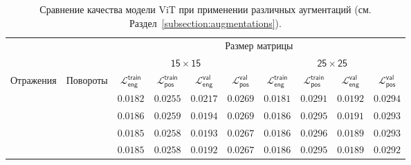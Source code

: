 \documentclass[a4paper,12pt]{extarticle}
\newcommand{\cmark}{\ding{51}}
\newcommand{\xmark}{\ding{55}}
\begin{document}
\begin{table}[t]
	\footnotesize
	\centering
	\begin{tabular}{cc|cccc|cccc}
		\toprule
		{} & {} & \multicolumn{8}{c}{\textsf{Размер матрицы}} \\
		\cmidrule(lr){3-10}
        {} & {} & \multicolumn{4}{c}{$\mathsf{15 \times 15}$} \vline & \multicolumn{4}{c}{$\mathsf{25 \times 25}$} \\
		\midrule
        \textsf{Отражения} & \textsf{Повороты} & $\mathcal{L}_{\mathsf{eng}}^{\mathsf{train}}$ & $\mathcal{L}_{\mathsf{pos}}^{\mathsf{train}}$ & $\mathcal{L}_{\mathsf{eng}}^{\mathsf{val}}$ & $\mathcal{L}_{\mathsf{pos}}^{\mathsf{val}}$ & $\mathcal{L}_{\mathsf{eng}}^{\mathsf{train}}$ & $\mathcal{L}_{\mathsf{pos}}^{\mathsf{train}}$ & $\mathcal{L}_{\mathsf{eng}}^{\mathsf{val}}$ & $\mathcal{L}_{\mathsf{pos}}^{\mathsf{val}}$ \\
        \midrule
        \xmark & \xmark & $\mathsf{0.0182}$ & $\mathsf{0.0255}$ & $\mathsf{0.0217}$ & $\mathsf{0.0269}$ & $\mathsf{0.0181}$ & $\mathsf{0.0291}$ & $\mathsf{0.0192}$ & $\mathsf{0.0294}$ \\
        \cmark & \xmark & $\mathsf{0.0186}$ & $\mathsf{0.0259}$ & $\mathsf{0.0194}$ & $\mathsf{0.0269}$ & $\mathsf{0.0186}$ & $\mathsf{0.0295}$ & $\mathsf{0.0191}$ & $\mathsf{0.0293}$ \\
        \xmark & \cmark & $\mathsf{0.0185}$ & $\mathsf{0.0258}$ & $\mathsf{0.0193}$ & $\mathsf{0.0267}$ & $\mathsf{0.0186}$ & $\mathsf{0.0296}$ & $\mathsf{0.0189}$ & $\mathsf{0.0293}$ \\
        \cmark & \cmark & $\mathsf{0.0185}$ & $\mathsf{0.0258}$ & $\mathsf{0.0192}$ & $\mathsf{0.0267}$ & $\mathsf{0.0186}$ & $\mathsf{0.0295}$ & $\mathsf{0.0189}$ & $\mathsf{0.0292}$ \\
        
		\bottomrule
	\end{tabular}
    \caption{Сравнение качества модели \textsf{ViT} при применении различных аугментаций (см. Раздел~\ref{subsection:augmentations}).}
	\label{table:augmentations}
\end{table}
\end{document}
